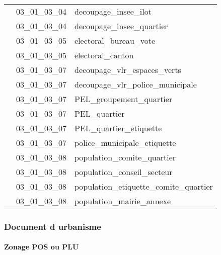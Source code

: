 \documentclass[12pt,titlepage,oneside]{book}
\begin{document}
\begin{supertabular}{|p{10cm}|c|p{15cm}|}
                    & 03\_01\_03\_04 & decoupage\_insee\_ilot\\


                    & 03\_01\_03\_04 & decoupage\_insee\_quartier\\


                    & 03\_01\_03\_05 & electoral\_bureau\_vote\\


                    & 03\_01\_03\_05 & electoral\_canton\\


                    & 03\_01\_03\_07 & decoupage\_vlr\_espaces\_verts\\


                    & 03\_01\_03\_07 & decoupage\_vlr\_police\_municipale\\


                    & 03\_01\_03\_07 & PEL\_groupement\_quartier\\


                    & 03\_01\_03\_07 & PEL\_quartier\\


                    & 03\_01\_03\_07 & PEL\_quartier\_etiquette\\


                    & 03\_01\_03\_07 & police\_municipale\_etiquette\\


                    & 03\_01\_03\_08 & population\_comite\_quartier\\


                    & 03\_01\_03\_08 & population\_conseil\_secteur\\


                    & 03\_01\_03\_08 & population\_etiquette\_comite\_quartier\\


                    & 03\_01\_03\_08 & population\_mairie\_annexe\\
\hline
\end{supertabular}

\subsubsection{\large Document d urbanisme}
\paragraph{Zonage POS ou PLU}
\noindent
\vspace{\baselineskip}
\end{document}
